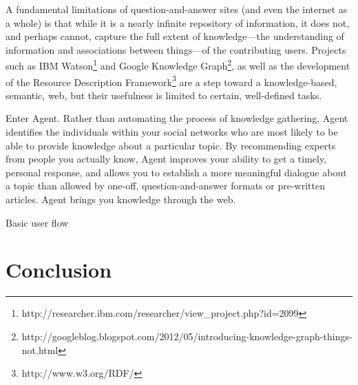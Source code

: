 A fundamental limitations of question-and-answer sites (and even the internet as
a whole) is that while it is a nearly infinite repository of information, it
does not, and perhaps cannot, capture the full extent of knowledge---the
understanding of information and associations between things---of the
contributing users. Projects such as IBM
Watson\footnote{http://researcher.ibm.com/researcher/view\_project.php?id=2099}
and Google Knowledge
Graph\footnote{http://googleblog.blogspot.com/2012/05/introducing-knowledge-graph-things-not.html},
as well as the development of the Resource Description
Framework\footnote{http://www.w3.org/RDF/} are a step toward a knowledge-based,
semantic, web, but their usefulness is limited to certain, well-defined tasks.

Enter Agent. Rather than automating the process of knowledge gathering, Agent
identifies the individuals within your social networks who are most likely to be
able to provide knowledge about a particular topic. By recommending experts
from people you actually know, Agent improves your ability to get a timely,
personal response, and allows you to establish a more meaningful dialogue about
a topic than allowed by one-off, question-and-answer formats or pre-written
articles. Agent brings you knowledge through the web.







Basic user flow

\section{Conclusion}
\label{sec:conclusion}






